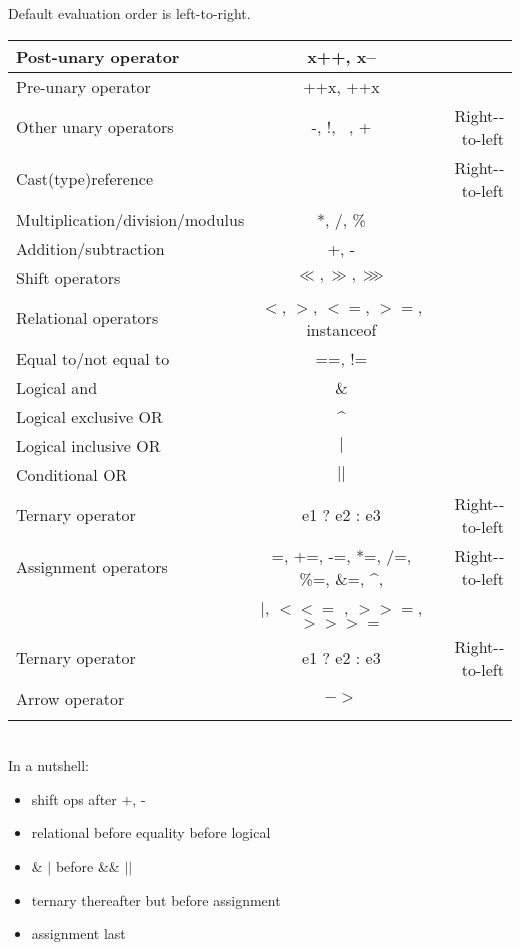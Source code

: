\documentclass{scrartcl}
\begin{document}
    Default evaluation order is left-to-right.

    \begin{tabular}{|l|c|r|}
        \hline
        Post-­unary operator& x++, x-- &  \\
        \hline
        Pre-­unary operator& ++x, ++x &  \\
        \hline
        Other unary operators& -­, !, ~, + &  Right-­to-­left \\
        \hline
        Cast(type)reference&  &  Right-­to-­left \\
        \hline
        Multiplication/division/modulus& *, /, \% &  \\
        \hline
        Addition/subtraction& +, - &  \\
        \hline
        Shift operators& $\ll, \gg, \ggg$ &  \\
        \hline
        Relational operators & $<$, $>$, $<=$, $>=$, instanceof & \\
        \hline
        Equal to/not equal to& ==, != &\\
        \hline
        Logical and& \& &  \\
        \hline
        Logical exclusive OR& \textasciicircum \\
        \hline
        Logical inclusive OR& $|$ &  \\
        \hline
        Conditional OR& $||$ &  \\
        \hline
        Ternary operator& e1 ? e2 : e3 & Right-­to-­left\\
        \hline
        Assignment operators& =, +=, -­=, *=, /=, \%=, \&=, \textasciicircum, & Right-­to-­left\\
        & $|$, $<<=$ , $>>=$, $>>>=$ & \\
        \hline
        Ternary operator& e1 ? e2 : e3 & Right-­to-­left\\
        \hline
        Arrow operator& $->$ &  \\\\
        \hline
    \end{tabular}
     \\

    In a nutshell:

    \begin{itemize}
        \item shift ops after +, -
        \item relational before equality before logical
        \item \& $|$ before \&\& $||$
        \item ternary thereafter but before assignment
        \item assignment last
    \end{itemize}
\end{document}
